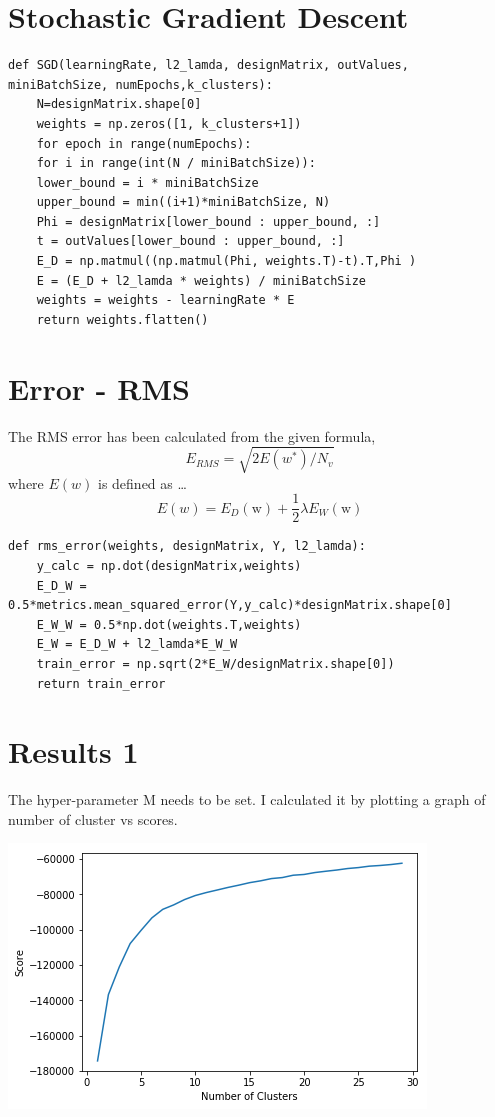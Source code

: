 \documentclass[a4paper,11pt]{article}
\begin{document}
\section*{Stochastic Gradient Descent}

\begin{lstlisting}[label={list:fourth}]
def SGD(learningRate, l2_lamda, designMatrix, outValues, miniBatchSize, numEpochs,k_clusters):
	N=designMatrix.shape[0]
	weights = np.zeros([1, k_clusters+1])
	for epoch in range(numEpochs):
	for i in range(int(N / miniBatchSize)):
	lower_bound = i * miniBatchSize
	upper_bound = min((i+1)*miniBatchSize, N)
	Phi = designMatrix[lower_bound : upper_bound, :]
	t = outValues[lower_bound : upper_bound, :]
	E_D = np.matmul((np.matmul(Phi, weights.T)-t).T,Phi )
	E = (E_D + l2_lamda * weights) / miniBatchSize
	weights = weights - learningRate * E
	return weights.flatten()
\end{lstlisting}

\section*{Error - RMS}
The RMS error has been calculated from the given formula,
\[
E_{RMS} = \sqrt{2E\left(w^*\right)/N_v}
\]
where $E\left(w\right) $ is defined as \dots
\[
E(w) = E_D(\mathrm{w}) + \frac{1}{2}\lambda E_W(\mathrm{w})
\]
\begin{lstlisting}[label={list:fourth}]
def rms_error(weights, designMatrix, Y, l2_lamda):
	y_calc = np.dot(designMatrix,weights)
	E_D_W = 0.5*metrics.mean_squared_error(Y,y_calc)*designMatrix.shape[0]
	E_W_W = 0.5*np.dot(weights.T,weights)
	E_W = E_D_W + l2_lamda*E_W_W
	train_error = np.sqrt(2*E_W/designMatrix.shape[0])
	return train_error
\end{lstlisting}

\section*{Results 1}

The hyper-parameter M needs to be set. I calculated it by plotting a graph of number of cluster vs scores.\\
\begin{center}
\includegraphics[scale=0.7]{2}
\end{center}
\end{document}
